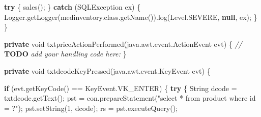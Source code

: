 \documentclass[
  10pt,
]{article}
\newenvironment{Shaded}{}{}
\newcommand{\AlertTok}[1]{\textcolor[rgb]{1.00,0.00,0.00}{\textbf{#1}}}
\newcommand{\BuiltInTok}[1]{\textcolor[rgb]{0.00,0.50,0.00}{#1}}
\newcommand{\CommentTok}[1]{\textcolor[rgb]{0.38,0.63,0.69}{\textit{#1}}}
\newcommand{\ControlFlowTok}[1]{\textcolor[rgb]{0.00,0.44,0.13}{\textbf{#1}}}
\newcommand{\DataTypeTok}[1]{\textcolor[rgb]{0.56,0.13,0.00}{#1}}
\newcommand{\DecValTok}[1]{\textcolor[rgb]{0.25,0.63,0.44}{#1}}
\newcommand{\FunctionTok}[1]{\textcolor[rgb]{0.02,0.16,0.49}{#1}}
\newcommand{\KeywordTok}[1]{\textcolor[rgb]{0.00,0.44,0.13}{\textbf{#1}}}
\newcommand{\NormalTok}[1]{#1}
\newcommand{\OperatorTok}[1]{\textcolor[rgb]{0.40,0.40,0.40}{#1}}
\newcommand{\StringTok}[1]{\textcolor[rgb]{0.25,0.44,0.63}{#1}}
\begin{document}
\begin{Shaded}
\begin{Highlighting}[numbers=left,,]
        \ControlFlowTok{try} \OperatorTok{\{}
            \FunctionTok{sales}\OperatorTok{();}
        \OperatorTok{\}} \ControlFlowTok{catch} \OperatorTok{(}\BuiltInTok{SQLException}\NormalTok{ ex}\OperatorTok{)} \OperatorTok{\{}
            \BuiltInTok{Logger}\OperatorTok{.}\FunctionTok{getLogger}\OperatorTok{(}\NormalTok{medinventory}\OperatorTok{.}\FunctionTok{class}\OperatorTok{.}\FunctionTok{getName}\OperatorTok{()).}\FunctionTok{log}\OperatorTok{(}\BuiltInTok{Level}\OperatorTok{.}\FunctionTok{SEVERE}\OperatorTok{,} \KeywordTok{null}\OperatorTok{,}\NormalTok{ ex}\OperatorTok{);}
        \OperatorTok{\}}
    \OperatorTok{\}}                                        

    \KeywordTok{private} \DataTypeTok{void} \FunctionTok{txtpriceActionPerformed}\OperatorTok{(}\NormalTok{java}\OperatorTok{.}\FunctionTok{awt}\OperatorTok{.}\FunctionTok{event}\OperatorTok{.}\FunctionTok{ActionEvent}\NormalTok{ evt}\OperatorTok{)} \OperatorTok{\{}                                         
        \CommentTok{// }\AlertTok{TODO}\CommentTok{ add your handling code here:}
    \OperatorTok{\}}                                        

    \KeywordTok{private} \DataTypeTok{void} \FunctionTok{txtdcodeKeyPressed}\OperatorTok{(}\NormalTok{java}\OperatorTok{.}\FunctionTok{awt}\OperatorTok{.}\FunctionTok{event}\OperatorTok{.}\FunctionTok{KeyEvent}\NormalTok{ evt}\OperatorTok{)} \OperatorTok{\{}                                    

        \ControlFlowTok{if} \OperatorTok{(}\NormalTok{evt}\OperatorTok{.}\FunctionTok{getKeyCode}\OperatorTok{()} \OperatorTok{==} \BuiltInTok{KeyEvent}\OperatorTok{.}\FunctionTok{VK\_ENTER}\OperatorTok{)} \OperatorTok{\{}
            \ControlFlowTok{try} \OperatorTok{\{}
                \BuiltInTok{String}\NormalTok{ dcode }\OperatorTok{=}\NormalTok{ txtdcode}\OperatorTok{.}\FunctionTok{getText}\OperatorTok{();}
\NormalTok{                pst }\OperatorTok{=}\NormalTok{ con}\OperatorTok{.}\FunctionTok{prepareStatement}\OperatorTok{(}\StringTok{"select * from product where id = ?"}\OperatorTok{);}
\NormalTok{                pst}\OperatorTok{.}\FunctionTok{setString}\OperatorTok{(}\DecValTok{1}\OperatorTok{,}\NormalTok{ dcode}\OperatorTok{);}
\NormalTok{                rs }\OperatorTok{=}\NormalTok{ pst}\OperatorTok{.}\FunctionTok{executeQuery}\OperatorTok{();}


\end{Highlighting}
\end{Shaded}
\end{document}
